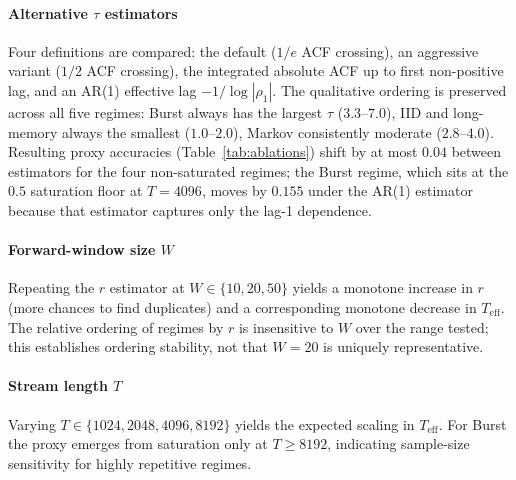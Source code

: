 \documentclass[sensors,article,submit,pdftex,moreauthors]{Definitions/mdpi}
\newcommand{\Teff}{T_{\mathrm{eff}}}
\begin{document}
\paragraph{Alternative $\tau$ estimators} Four definitions are compared: the default ($1/e$ ACF crossing), an aggressive variant ($1/2$ ACF crossing), the integrated absolute ACF up to first non-positive lag, and an AR(1) effective lag $-1/\log|\rho_1|$. The qualitative ordering is preserved across all five regimes: Burst always has the largest $\tau$ ($3.3$--$7.0$), IID and long-memory always the smallest ($1.0$--$2.0$), Markov consistently moderate ($2.8$--$4.0$). Resulting proxy accuracies (Table~\ref{tab:ablations}) shift by at most $0.04$ between estimators for the four non-saturated regimes; the Burst regime, which sits at the $0.5$ saturation floor at $T = 4096$, moves by $0.155$ under the AR(1) estimator because that estimator captures only the lag-1 dependence.

\paragraph{Forward-window size $W$} Repeating the $r$ estimator at $W \in \{10, 20, 50\}$ yields a monotone increase in $r$ (more chances to find duplicates) and a corresponding monotone decrease in $\Teff$. The relative ordering of regimes by $r$ is insensitive to $W$ over the range tested; this establishes ordering stability, not that $W = 20$ is uniquely representative.

\paragraph{Stream length $T$} Varying $T \in \{1024, 2048, 4096, 8192\}$ yields the expected scaling in $\Teff$. For Burst the proxy emerges from saturation only at $T \geq 8192$, indicating sample-size sensitivity for highly repetitive regimes.
\end{document}
